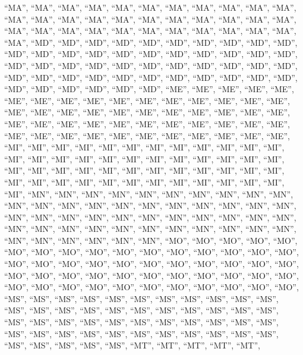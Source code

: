 \documentclass[
]{article}
\begin{document}
``MA'', ``MA'', ``MA'', ``MA'', ``MA'', ``MA'', ``MA'', ``MA'', ``MA'',
``MA'', ``MA'', ``MA'', ``MA'', ``MA'', ``MA'', ``MA'', ``MA'', ``MA'',
``MA'', ``MA'', ``MA'', ``MA'', ``MA'', ``MA'', ``MA'', ``MA'', ``MA'',
``MA'', ``MA'', ``MA'', ``MA'', ``MA'', ``MA'', ``MA'', ``MD'', ``MD'',
``MD'', ``MD'', ``MD'', ``MD'', ``MD'', ``MD'', ``MD'', ``MD'', ``MD'',
``MD'', ``MD'', ``MD'', ``MD'', ``MD'', ``MD'', ``MD'', ``MD'', ``MD'',
``MD'', ``MD'', ``MD'', ``MD'', ``MD'', ``MD'', ``MD'', ``MD'', ``MD'',
``MD'', ``MD'', ``MD'', ``MD'', ``MD'', ``MD'', ``MD'', ``MD'', ``MD'',
``MD'', ``MD'', ``MD'', ``MD'', ``MD'', ``MD'', ``MD'', ``MD'', ``MD'',
``MD'', ``MD'', ``ME'', ``ME'', ``ME'', ``ME'', ``ME'', ``ME'', ``ME'',
``ME'', ``ME'', ``ME'', ``ME'', ``ME'', ``ME'', ``ME'', ``ME'', ``ME'',
``ME'', ``ME'', ``ME'', ``ME'', ``ME'', ``ME'', ``ME'', ``ME'', ``ME'',
``ME'', ``ME'', ``ME'', ``ME'', ``ME'', ``ME'', ``ME'', ``ME'', ``ME'',
``ME'', ``ME'', ``ME'', ``ME'', ``ME'', ``ME'', ``ME'', ``ME'', ``ME'',
``ME'', ``ME'', ``ME'', ``ME'', ``ME'', ``ME'', ``MI'', ``MI'', ``MI'',
``MI'', ``MI'', ``MI'', ``MI'', ``MI'', ``MI'', ``MI'', ``MI'', ``MI'',
``MI'', ``MI'', ``MI'', ``MI'', ``MI'', ``MI'', ``MI'', ``MI'', ``MI'',
``MI'', ``MI'', ``MI'', ``MI'', ``MI'', ``MI'', ``MI'', ``MI'', ``MI'',
``MI'', ``MI'', ``MI'', ``MI'', ``MI'', ``MI'', ``MI'', ``MI'', ``MI'',
``MI'', ``MI'', ``MI'', ``MI'', ``MI'', ``MI'', ``MI'', ``MI'', ``MI'',
``MI'', ``MN'', ``MN'', ``MN'', ``MN'', ``MN'', ``MN'', ``MN'', ``MN'',
``MN'', ``MN'', ``MN'', ``MN'', ``MN'', ``MN'', ``MN'', ``MN'', ``MN'',
``MN'', ``MN'', ``MN'', ``MN'', ``MN'', ``MN'', ``MN'', ``MN'', ``MN'',
``MN'', ``MN'', ``MN'', ``MN'', ``MN'', ``MN'', ``MN'', ``MN'', ``MN'',
``MN'', ``MN'', ``MN'', ``MN'', ``MN'', ``MN'', ``MN'', ``MN'', ``MN'',
``MN'', ``MN'', ``MN'', ``MN'', ``MN'', ``MO'', ``MO'', ``MO'', ``MO'',
``MO'', ``MO'', ``MO'', ``MO'', ``MO'', ``MO'', ``MO'', ``MO'', ``MO'',
``MO'', ``MO'', ``MO'', ``MO'', ``MO'', ``MO'', ``MO'', ``MO'', ``MO'',
``MO'', ``MO'', ``MO'', ``MO'', ``MO'', ``MO'', ``MO'', ``MO'', ``MO'',
``MO'', ``MO'', ``MO'', ``MO'', ``MO'', ``MO'', ``MO'', ``MO'', ``MO'',
``MO'', ``MO'', ``MO'', ``MO'', ``MO'', ``MO'', ``MO'', ``MO'', ``MO'',
``MS'', ``MS'', ``MS'', ``MS'', ``MS'', ``MS'', ``MS'', ``MS'', ``MS'',
``MS'', ``MS'', ``MS'', ``MS'', ``MS'', ``MS'', ``MS'', ``MS'', ``MS'',
``MS'', ``MS'', ``MS'', ``MS'', ``MS'', ``MS'', ``MS'', ``MS'', ``MS'',
``MS'', ``MS'', ``MS'', ``MS'', ``MS'', ``MS'', ``MS'', ``MS'', ``MS'',
``MS'', ``MS'', ``MS'', ``MS'', ``MS'', ``MS'', ``MS'', ``MS'', ``MS'',
``MS'', ``MS'', ``MS'', ``MS'', ``MT'', ``MT'', ``MT'', ``MT'', ``MT'',
\end{document}
